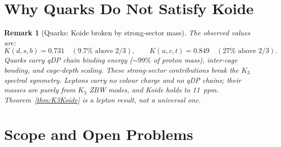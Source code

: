 \documentclass[11pt]{article}
\newtheorem{remark}{Remark}[section]
\begin{document}
\section{Why Quarks Do Not Satisfy Koide}

\begin{remark}[Quarks: Koide broken by strong-sector mass]
\label{rem:quarks}
The observed values are:
\[
K(d,s,b) = 0.731 \quad(9.7\%\text{ above }2/3), \qquad
K(u,c,t) = 0.849 \quad(27\%\text{ above }2/3).
\]
Quarks carry qDP chain binding energy ($\sim\!99\%$ of proton mass),
inter-cage bonding, and cage-depth scaling.  These strong-sector
contributions break the $K_3$ spectral symmetry.  Leptons carry no
colour charge and no qDP chains; their masses are purely from $K_3$
ZBW modes, and Koide holds to 11~ppm.
Theorem~\ref{thm:K3Koide} is a lepton result, not a universal one.
\end{remark}

\section{Scope and Open Problems}
\end{document}
